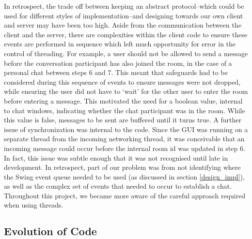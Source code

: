 In retrospect, the trade off between keeping an abstract protocol--which could be used for different styles of implementation--and designing towards our own client and server may have been too high. Aside from the communication between the client and the server, there are complexities within the client code to ensure these events are performed in sequence which left much opportunity for error in the control of threading. For example, a user should not be allowed to send a message before the conversation participant has also joined the room, in the case of a personal chat between steps 6 and 7. This meant that safeguards had to be considered during this sequence of events to ensure messages were not dropped, while ensuring the user did not have to `wait' for the other user to enter the room before entering a message. This motivated the need for a boolean value, internal to chat windows, indicating whether the chat participant was in the room. While this value is false, messages to be sent are buffered until it turns true. A further issue of synchronization was internal to the code. Since the GUI was running on a separate thread from the incoming networking thread, it was conceivable that an incoming message could occur before the internal room id was updated in step 6. In fact, this issue was subtle enough that it was not recognised until late in development. In retrospect, part of our problem was from not identifying where the Swing event queue needed to be used (as discussed in section \ref{design_impl}), as well as the complex set of events that needed to occur to establish a chat. Throughout this project, we became more aware of the careful approach required when using threads.

\subsection{Evolution of Code}
\label{code_evol}

